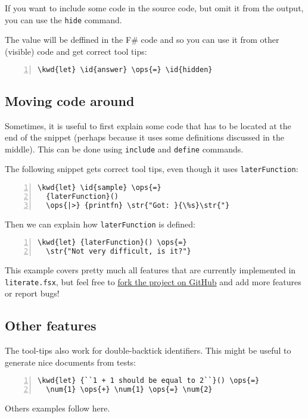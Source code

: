 \documentclass{article}
\newcommand{\id}[1]{\textcolor{black}{#1}}
\newcommand{\kwd}[1]{\textcolor{navy}{#1}}
\newcommand{\num}[1]{\textcolor{officegreen}{#1}}
\newcommand{\ops}[1]{\textcolor{purple}{#1}}
\newcommand{\str}[1]{\textcolor{olive}{#1}}
\begin{document}
If you want to include some code in the source code, 
but omit it from the output, you can use the \texttt{hide} 
command.


The value will be deffined in the F\# code and so you
can use it from other (visible) code and get correct
tool tips:
\begin{Verbatim}[commandchars=\\\{\}, numbers=left]
\kwd{let} \id{answer} \ops{=} \id{hidden}
\end{Verbatim}

\subsection*{Moving code around}



Sometimes, it is useful to first explain some code that
has to be located at the end of the snippet (perhaps 
because it uses some definitions discussed in the middle).
This can be done using \texttt{include} and \texttt{define} commands.


The following snippet gets correct tool tips, even though
it uses \texttt{laterFunction}:
\begin{Verbatim}[commandchars=\\\{\}, numbers=left]
\kwd{let} \id{sample} \ops{=} 
  {laterFunction}()
  \ops{|>} {printfn} \str{"Got: }{\%s}\str{"}
\end{Verbatim}



Then we can explain how \texttt{laterFunction} is defined:
\begin{Verbatim}[commandchars=\\\{\}, numbers=left]
\kwd{let} {laterFunction}() \ops{=} 
  \str{"Not very difficult, is it?"}
\end{Verbatim}



This example covers pretty much all features that are 
currently implemented in \texttt{literate.fsx}, but feel free 
to \href{https://github.com/tpetricek/FSharp.Formatting}{fork the project on GitHub} and add more 
features or report bugs!
\subsection*{Other features}



The tool-tips also work for double-backtick identifiers.
This might be useful to generate nice documents from tests:
\begin{Verbatim}[commandchars=\\\{\}, numbers=left]
\kwd{let} {``1 + 1 should be equal to 2``}() \ops{=}
  \num{1} \ops{+} \num{1} \ops{=} \num{2}
\end{Verbatim}



Others examples follow here.
\end{document}
